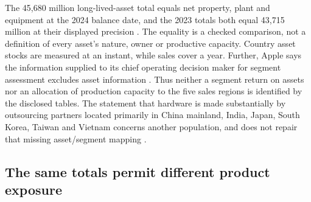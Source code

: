 The 45,680 million long-lived-asset total equals net property, plant and
equipment at the 2024 balance date, and the 2023 totals both equal 43,715
million at their displayed precision
\citep[Notes 5 and 13, printed pp.~39 and 47]{apple2024}. The equality is
a checked comparison, not a definition of every asset's nature, owner or
productive capacity. Country asset stocks are measured at an instant, while
sales cover a year. Further, Apple says the information supplied to its chief
operating decision maker for segment assessment excludes asset information
\citep[Note 13, printed p.~46]{apple2024}. Thus neither a segment return on
assets nor an allocation of production capacity to the five sales regions is
identified by the disclosed tables. The statement that hardware is made
substantially by outsourcing partners located primarily in China mainland,
India, Japan, South Korea, Taiwan and Vietnam concerns another population,
and does not repair that missing asset/segment mapping
\citep[Note 12, printed p.~46]{apple2024}.

\subsection{The same totals permit different product exposure}

